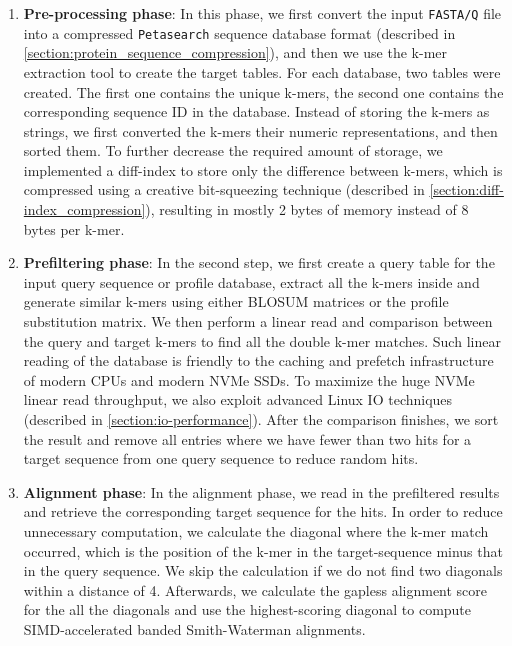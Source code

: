 \begin{enumerate}[leftmargin=*]
  \item \textbf{Pre-processing phase}:
        In this phase, we first convert the input \texttt{FASTA/Q} file into a compressed \texttt{Petasearch} sequence database format (described in \cref{section:protein_sequence_compression}), and then we use the k-mer extraction tool to create the target tables.
        For each database, two tables were created.
        The first one contains the unique k-mers, the second one contains the corresponding sequence ID in the database.
        Instead of storing the k-mers as strings, we first converted the k-mers their numeric representations, and then sorted them.
        To further decrease the required amount of storage, we implemented a diff-index to store only the difference between k-mers, which is compressed using a creative bit-squeezing technique (described in \cref{section:diff-index_compression}), resulting in mostly 2 bytes of memory instead of 8 bytes per k-mer.
  \item \textbf{Prefiltering phase}: In the second step, we first create a query table for the input query sequence or profile database, extract all the k-mers inside and generate similar k-mers using either BLOSUM \cite{henikoff1992amino} matrices or the profile substitution matrix.
        We then perform a linear read and comparison between the query and target k-mers to find all the double k-mer matches. Such linear reading of the database is friendly to the caching and prefetch infrastructure of modern CPUs and modern NVMe SSDs.
        To maximize the huge NVMe linear read throughput, we also exploit advanced Linux IO techniques (described in \cref{section:io-performance}).
        After the comparison finishes, we sort the result and remove all entries where we have fewer than two hits for a target sequence from one query sequence to reduce random hits.
  \item \textbf{Alignment phase}: In the alignment phase, we read in the prefiltered results and retrieve the corresponding target sequence for the hits. In order to reduce unnecessary computation, we calculate the diagonal where the k-mer match occurred, which is the position of the k-mer in the target-sequence minus that in the query sequence.
  We skip the calculation if we do not find two diagonals within a distance of 4. Afterwards, we calculate the gapless alignment score for the all the diagonals and use the highest-scoring diagonal to compute SIMD-accelerated banded Smith-Waterman alignments.
\end{enumerate}

